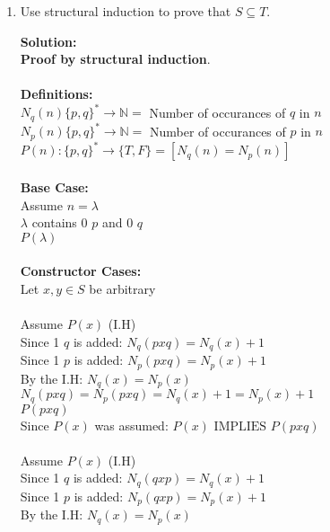 \documentclass[11pt]{article}
\def\nats {{\mathbb N}}
\newcommand{\Implies}{\mbox{ IMPLIES }}
\begin{document}
\begin{enumerate}
\begin{solution}
\end{solution}

\item
\begin{question}


Use structural induction to prove that $S \subseteq T$.
\end{question}

\begin{solution}
{\bf Solution:}\\
{\bf  Proof by structural induction}.\\\\
{\bf Definitions:}\\
$N_q(n) \{p,q\}^* \rightarrow \nats = $ Number of occurances of $q$ in $n$\\
$N_p(n) \{p,q\}^* \rightarrow \nats = $ Number of occurances of $p$ in $n$\\
$P(n): \{p,q\}^* \rightarrow \{T,F\}= \left[N_q(n) = N_p(n) \right]$\\\\
{\bf Base Case:}\\
\null\quad Assume $n=\lambda$\\
\null\quad $\lambda$ contains $0$ $p$ and $0$ $q$ \\
\null\quad $P(\lambda)$\\\\
{\bf Constructor Cases:}\\
\null\quad Let $x,y\in S$ be arbitrary\\\\
\null\qquad Assume $P(x)$ (I.H)\\
\null\qquad Since 1 $q$ is added: $N_q(pxq) = N_q(x) + 1$ \\
\null\qquad Since 1 $p$ is added: $N_p(pxq) = N_p(x) + 1$\\
\null\qquad By the I.H: $N_q(x) = N_p(x)$\\
\null\qquad $N_q(pxq) = N_p(pxq) = N_q(x) + 1 = N_p(x) + 1$\\
\null\qquad $P(pxq)$\\
\null\quad Since $P(x)$ was assumed: $P(x)\Implies P(pxq)$\\\\
\null\qquad Assume $P(x)$ (I.H)\\
\null\qquad Since 1 $q$ is added: $N_q(qxp) = N_q(x) + 1$\\
\null\qquad Since 1 $p$ is added: $N_p(qxp) = N_p(x) + 1$ \\
\null\qquad By the I.H: $N_q(x) = N_p(x)$\\

\end{solution}
\end{enumerate}
\end{document}
